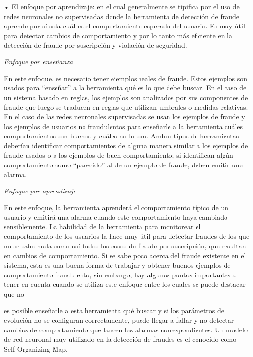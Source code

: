 \documentclass[a4paper,11pt]{article}
\begin{document}
      • El enfoque por aprendizaje: en el cual generalmente se tipifica  por
el  uso  de  redes  neuronales  no  supervisadas  donde  la  herramienta  de
detección de fraude aprende por sí sola cuál es el  comportamiento  esperado
del usuario. Es muy útil para detectar cambios de comportamiento  y  por  lo
tanto más eficiente en la detección de fraude por  suscripción  y  violación
de seguridad.


\textit{Enfoque por enseñanza}

      En este enfoque, es necesario tener ejemplos reales de  fraude.  Estos
ejemplos son usados para “enseñar” a la  herramienta  qué  es  lo  que  debe
buscar. En el caso  de  un  sistema  basado  en  reglas,  los  ejemplos  son
analizados por sus componentes de fraude que luego  se  traducen  en  reglas
que utilizan  umbrales  o  medidas  relativas.  En  el  caso  de  las  redes
neuronales supervisadas se usan los ejemplos de fraude  y  los  ejemplos  de
usuarios  no  fraudulentos  para   enseñarle   a   la   herramienta   cuáles
comportamientos son buenos y cuáles no lo son. Ambos tipos  de  herramientas
deberían  identificar  comportamientos  de  alguna  manera  similar  a   los
ejemplos de fraude usados o  a  los  ejemplos  de  buen  comportamiento;  si
identifican algún  comportamiento  como  “parecido”  al  de  un  ejemplo  de
fraude, deben emitir una alarma.

\textit{Enfoque por aprendizaje}

      En este enfoque, la herramienta aprenderá el comportamiento típico  de
un usuario y emitirá una alarma cuando  este  comportamiento  haya  cambiado
sensiblemente.  La  habilidad  de  la   herramienta   para   monitorear   el
comportamiento de los usuarios la hace muy útil  para  detectar  fraudes  de
los que no se sabe nada como así todos los casos de fraude por  suscripción,
que resultan en cambios de  comportamiento.  Si  se  sabe  poco  acerca  del
fraude existente en el sistema, esta  es  una  buena  forma  de  trabajar  y
obtener buenos ejemplos de  comportamiento  fraudulento;  sin  embargo,  hay
algunos puntos importantes a tener en cuenta cuando se utiliza este  enfoque
entre los cuales se puede destacar que no

es posible enseñarle a esta herramienta qué buscar y si  los  parámetros  de
evolución no se  configuran  correctamente,  puede  llegar  a  fallar  y  no
detectar cambios de comportamiento que lancen las alarmas correspondientes.
      Un modelo de red neuronal muy utilizado en la detección de fraudes  es
el conocido como Self-Organizing Map.
\end{document}
